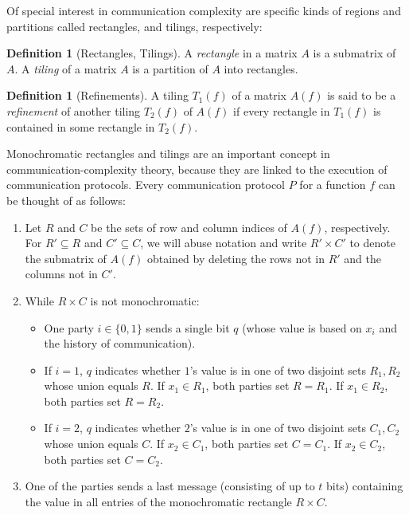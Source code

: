 \documentclass{article}
\theoremstyle{theorem}
\theoremstyle{definition}
\newtheorem{definition}[theorem]{Definition}
\theoremstyle{remark}
\begin{document}
Of special interest in communication complexity are specific kinds
of regions and partitions called rectangles, and tilings,
respectively:

\begin{definition}[Rectangles, Tilings]\label{def:rect}
A \emph{rectangle} in a matrix $A$ is a submatrix of $A$. A
\emph{tiling} of a matrix $A$ is a partition of $A$ into rectangles.
\end{definition}

\begin{definition}[Refinements]
A tiling $T_1(f)$ of a matrix $A(f)$ is said to be a
\emph{refinement} of another tiling $T_2(f)$ of $A(f)$ if every
rectangle in $T_1(f)$ is contained in some rectangle in $T_2(f)$.
\end{definition}

Monochromatic rectangles and tilings are an important concept in
com\-mu\-ni\-ca\-tion-com\-plex\-i\-ty theory, because they are linked to the
execution of communication protocols. Every communication protocol
$P$ for a function $f$ can be thought of as follows:
\begin{enumerate}
\item Let $R$ and $C$ be the sets of row and column indices of $A(f)$, respectively.  For $R'\subseteq R$ and $C'\subseteq C$, we will abuse notation and write $R'\times C'$ to denote the submatrix of $A(f)$ obtained by deleting the rows not in $R'$ and the columns not in $C'$.

\item While $R\times C$ is not monochromatic:

\begin{itemize}

\item One party $i\in \{0,1\}$ sends a single bit $q$ (whose value
is based on $x_i$ and the history of communication).

\item If $i=1$, $q$ indicates whether $1$'s value is in one of
two disjoint sets $R_1,R_2$ whose union equals $R$. If $x_1\in R_1$,
both parties set $R=R_1$. If $x_1\in R_2$, both parties set $R=R_2$.

\item If $i=2$, $q$ indicates whether $2$'s value is in one of
two disjoint sets $C_1,C_2$ whose union equals $C$. If $x_2\in C_1$,
both parties set $C=C_1$. If $x_2\in C_2$, both parties set $C=C_2$.
\end{itemize}

\item One of the parties sends a last message (consisting of up to $t$ bits) containing the value in all
entries of the monochromatic rectangle $R\times C$.
\end{enumerate}
\end{document}
